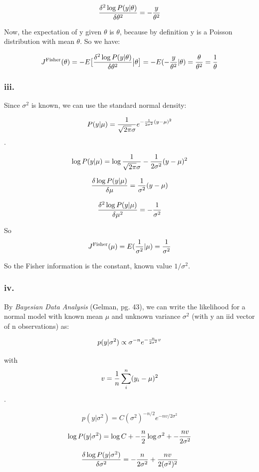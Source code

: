 \documentclass{article}
\begin{document}
\[{\delta^2\log P(y\vert\theta) \over \delta\theta^2} = -{y \over \theta^2}\]

Now, the expectation of y given \(\theta\) is \(\theta\), because by definition
y is a Poisson distribution with mean \(\theta\). So we have:

\[J^{\text{Fisher}}(\theta) = -E \big[ {\delta^2\log P(y\vert\theta) \over \delta\theta^2} \big \vert \theta \big]
= -E(-{y \over \theta^2} | \theta) = {\theta \over \theta^2} = {1 \over \theta}\]

\subsubsection{iii.}

Since \(\sigma^2\) is known, we can use the standard normal density:

\[P(y\vert\mu) = {1 \over \sqrt{2\pi}\sigma}e^{-{1 \over 2\sigma^2}(y - \mu)^2}\].

\[\log P(y\vert\mu) = \log{1 \over \sqrt{2\pi}\sigma} - {1 \over 2\sigma^2}(y - \mu)^2\]

\[{\delta\log P(y\vert\mu) \over \delta\mu} = {1 \over \sigma^2}(y - \mu)\]

\[{\delta^2\log P(y\vert\mu) \over \delta\mu^2} = -{1 \over \sigma^2}\]

So \[J^{\text{Fisher}}(\mu) = E({1 \over \sigma^2} \vert \mu) = {1 \over \sigma^2}\]

So the Fisher information is the constant, known value \(1 / \sigma^2\).

\subsubsection{iv.}

By \textit{Bayesian Data Analysis} (Gelman, pg. 43), we can write the likelihood for a normal model with known mean \(\mu\)
and unknown variance \(\sigma^2\) (with y an iid vector of n observations) as:

\[p(y \vert \sigma^2) \propto \sigma^{-n} e^{-{n \over 2\sigma^2}v}\]

with \[v = {1 \over n} \sum_i^n (y_i - \mu)^2\].

\[p(y \vert \sigma^2) = C (\sigma^2)^{-n / 2} e^{-{nv/ 2\sigma^2}}\]

\[\log P(y\vert\sigma^2) = \log C + -{n \over 2}\log{\sigma^2} + -{nv \over 2\sigma^2}\]

\[{\delta\log P(y\vert\sigma^2) \over \delta\sigma^2} = -{n \over 2\sigma^2} + {nv \over 2(\sigma^2)^2}\]
\end{document}
